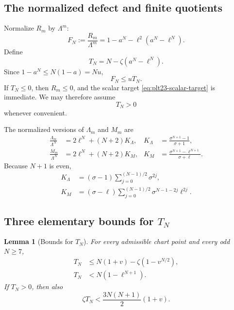 \documentclass[11pt]{article}
\newtheorem{lemma}[theorem]{Lemma}
\numberwithin{equation}{section}
\begin{document}
\subsection{The normalized defect and finite quotients}

Normalize $R_m$ by $\Lambda^m$:
\begin{equation}\label{eq:plt23-F-def}
  F_N:=\frac{R_m}{\Lambda^m}
  =1-a^N-\ell^2(a^N-\ell^N).
\end{equation}
Define
\begin{equation}\label{eq:plt23-T-def}
  T_N=N-\zeta(a^N-\ell^N).
\end{equation}
Since $1-a^N\le N(1-a)=Nu$,
\begin{equation}\label{eq:plt23-F-T}
  F_N\le uT_N.
\end{equation}
If $T_N\le0$, then $R_m\le0$, and the scalar target \eqref{eq:plt23-scalar-target} is immediate.
We may therefore assume
\begin{equation}\label{eq:plt23-T-positive}
  T_N>0
\end{equation}
whenever convenient.

The normalized versions of $\Lambda_m$ and $M_m$ are
\begin{align}
  \frac{\Lambda_m}{\Lambda^N}
  &=2\ell^N+(N+2)K_\Lambda,
  &
  K_\Lambda&=\frac{\sigma^{N+1}-1}{\sigma+1},
  \label{eq:plt23-KA-def}\\
  \frac{M_m}{\Lambda^N}
  &=2\ell^N+(N+2)K_M,
  &
  K_M&=\frac{\sigma^{N+1}-\ell^{N+1}}{\sigma+\ell}.
  \label{eq:plt23-KL-def}
\end{align}
Because $N+1$ is even,
\begin{align}
  K_\Lambda&=(\sigma-1)
  \sum_{j=0}^{(N-1)/2}\sigma^{2j},
  \label{eq:plt23-KA-sum}\\
  K_M&=(\sigma-\ell)
  \sum_{j=0}^{(N-1)/2}
  \sigma^{N-1-2j}\ell^{2j}.
  \label{eq:plt23-KL-sum}
\end{align}

\subsection{Three elementary bounds for \texorpdfstring{$T_N$}{TN}}

\begin{lemma}[Bounds for $T_N$]\label{lem:plt23-T-bounds}
  For every admissible chart point and every odd $N\ge7$,
  \begin{align}
    T_N&\le N(1+v)-\zeta(1-v^{N/2}),
    \label{eq:plt23-T-bound-one}\\
    T_N&<N(1-\ell^{N+1}).
    \label{eq:plt23-T-bound-two}
  \end{align}
  If $T_N>0$, then also
  \begin{equation}\label{eq:plt23-T-tangent-bound}
    \zeta T_N<\frac{3N(N+1)}{2}(1+v).
  \end{equation}
\end{lemma}
\end{document}
